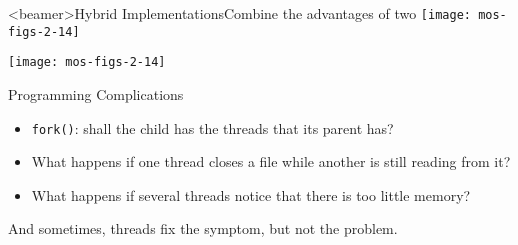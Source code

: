 \begin{frame}<beamer>{Hybrid Implementations}{Combine the advantages of two}
  \centering\texttt{[image: mos-figs-2-14]}
\end{frame}

\begin{center}
  \texttt{[image: mos-figs-2-14]}
\end{center}


\begin{frame}{Programming Complications}
  \begin{itemize}
  \item \texttt{fork()}: shall the child has the threads that its parent has?
  \item What happens if one thread closes a file while another is still reading from it?
  \item What happens if several threads notice that there is too little memory?
  \end{itemize}
  \alert{And sometimes, threads fix the symptom, but not the problem.}
\end{frame}

